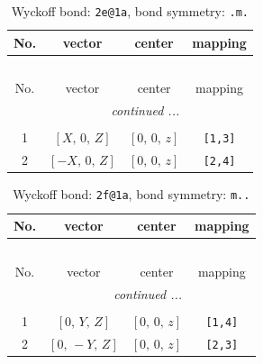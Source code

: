 \documentclass[fleqn,8pt]{jsarticle}
\begin{document}
\begin{longtable}{cccc}
\caption{Wyckoff bond: {\tt 2e@1a}, bond symmetry: {\tt .m.}}
 \\
 \hline \hline
No. & vector & center & mapping \\ \hline \endfirsthead

\multicolumn{3}{l}{\tablename\ \thetable{}} \\
 \hline \hline
No. & vector & center & mapping \\ \hline \endhead

 \hline \hline
\multicolumn{3}{r}{\footnotesize\it continued ...} \\ \endfoot

 \hline \hline
\multicolumn{3}{r}{} \\ \endlastfoot

1 & $\left[ X,\, 0,\, Z \right]$ & $\left[ 0,\, 0,\, z \right]$ & {\tt [1,3]} \\ \hline
2 & $\left[ - X,\, 0,\, Z \right]$ & $\left[ 0,\, 0,\, z \right]$ & {\tt [2,4]} \\
\end{longtable}
\renewcommand{\arraystretch}{1.2}
\begin{longtable}{cccc}
\caption{Wyckoff bond: {\tt 2f@1a}, bond symmetry: {\tt m..}}
 \\
 \hline \hline
No. & vector & center & mapping \\ \hline \endfirsthead

\multicolumn{3}{l}{\tablename\ \thetable{}} \\
 \hline \hline
No. & vector & center & mapping \\ \hline \endhead

 \hline \hline
\multicolumn{3}{r}{\footnotesize\it continued ...} \\ \endfoot

 \hline \hline
\multicolumn{3}{r}{} \\ \endlastfoot

1 & $\left[ 0,\, Y,\, Z \right]$ & $\left[ 0,\, 0,\, z \right]$ & {\tt [1,4]} \\ \hline
2 & $\left[ 0,\, - Y,\, Z \right]$ & $\left[ 0,\, 0,\, z \right]$ & {\tt [2,3]} \\
\end{longtable}
\renewcommand{\arraystretch}{1.2}
\end{document}
